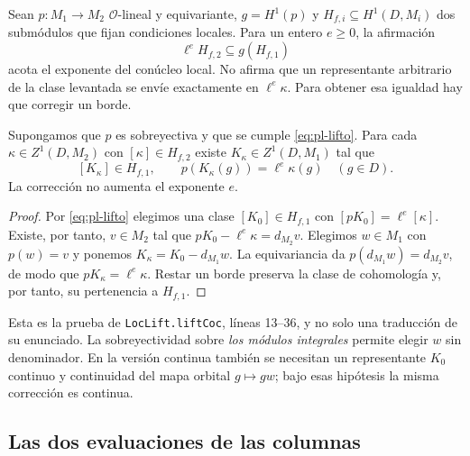Sean $p:M_1\to M_2$ $\mathcal O$-lineal y equivariante, $g=H^1(p)$ y
$H_{f,i}\subseteq H^1(D,M_i)$ dos submódulos que fijan condiciones
locales. Para un
entero $e\ge0$, la afirmación
\begin{equation}
 \ell^e H_{f,2}\subseteq g(H_{f,1})
 \label{eq:pl-lifto}
\end{equation}
acota el exponente del conúcleo local. No afirma que un representante
arbitrario de la clase levantada se envíe exactamente en
$\ell^e\kappa$. Para obtener esa igualdad hay que corregir un borde.

\begin{proposicion}
\label{prop:pl-cociclo-exacto}
Supongamos que $p$ es sobreyectiva y que se cumple
\eqref{eq:pl-lifto}. Para cada $\kappa\in Z^1(D,M_2)$ con
$[\kappa]\in H_{f,2}$ existe $K_\kappa\in Z^1(D,M_1)$ tal que
\[
 [K_\kappa]\in H_{f,1},\qquad
 p(K_\kappa(g))=\ell^e\kappa(g)\quad(g\in D).
\]
La corrección no aumenta el exponente $e$.
\end{proposicion}
\begin{proof}
Por \eqref{eq:pl-lifto} elegimos una clase $[K_0]\in H_{f,1}$ con
$[pK_0]=\ell^e[\kappa]$. Existe, por tanto, $v\in M_2$ tal que
$pK_0-\ell^e\kappa=d_{M_2}v$. Elegimos $w\in M_1$ con $p(w)=v$
y ponemos $K_\kappa=K_0-d_{M_1}w$. La equivariancia da
$p(d_{M_1}w)=d_{M_2}v$, de modo que $pK_\kappa=\ell^e\kappa$.
Restar un borde preserva la clase de cohomología y, por tanto, su
pertenencia a $H_{f,1}$.
\end{proof}

Esta es la prueba de \texttt{LocLift.liftCoc}, líneas 13--36, y no
solo una traducción de su enunciado. La sobreyectividad sobre
\emph{los módulos integrales} permite elegir $w$ sin denominador.
En la versión continua también se necesitan un representante $K_0$
continuo y continuidad del mapa orbital $g\mapsto gw$; bajo esas
hipótesis la misma corrección es continua.

\subsection{Las dos evaluaciones de las columnas}
\label{subsec:pl-columnas}

